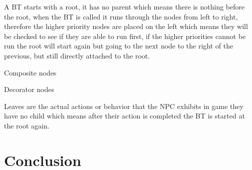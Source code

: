 \documentclass{scrartcl}
\begin{document}
A BT starts with a root, it has no parent which means there is nothing before the root, when the BT is called it runs through the nodes from left to right, therefore the higher priority nodes are placed on the left which means they will be checked to see if they are able to run first, if the higher priorities cannot be run the root will start again but going to the next node to the right of the previous, but still directly attached to the root.

Composite nodes

Decorator nodes

Leaves are the actual actions or behavior that the NPC exhibits in game they have no child which means after their action is completed the BT is started at the root again\cite{marzinotto2014towards}.

\section{Conclusion}

 \cite{youtube} \cite{UE4} \cite{nicolau2016evolutionary} \cite{nareyek2004ai} 



\end{document}

